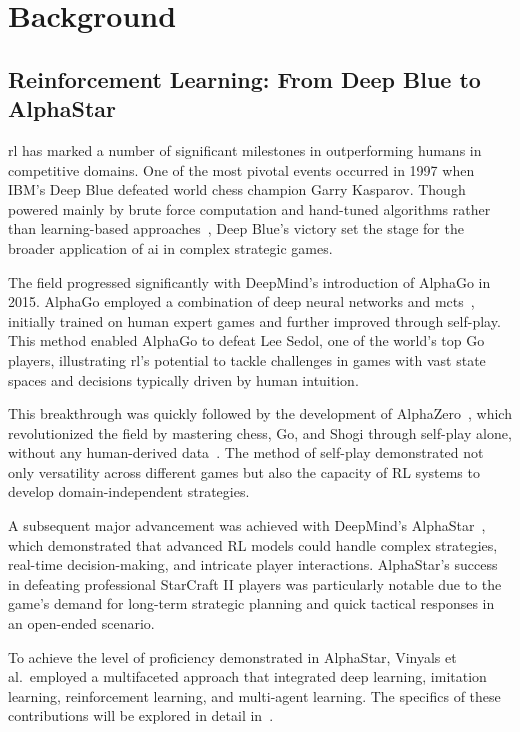 \section{Background}%
\label{sec:background}

    \subsection*{Reinforcement Learning: From Deep Blue to AlphaStar}%

\Gls{rl} has marked a number of significant milestones in outperforming humans 
in competitive domains. One of the most pivotal events occurred in 1997 
when IBM's Deep Blue defeated world chess champion Garry Kasparov. Though 
powered mainly by brute force computation and hand-tuned algorithms rather than 
learning-based approaches~\cite{campbell2002}, Deep Blue's victory set the 
stage for the broader application of \gls{ai} in complex strategic games.

The field progressed significantly with DeepMind's introduction of AlphaGo 
in 2015. AlphaGo employed a combination of deep neural networks and 
\gls{mcts}~\cite{silver2016}, initially trained on human expert games and 
further improved through self-play.
This method enabled AlphaGo to defeat Lee Sedol, one of the world's top Go 
players, illustrating \gls{rl}'s potential to tackle challenges in games with 
vast state spaces and decisions typically driven by human intuition.

This breakthrough was quickly followed by the development of 
AlphaZero~\cite{silver2017}, which revolutionized the field by mastering chess,
Go, and Shogi through self-play alone, without any human-derived 
data~\cite{silver2017a}. The method of self-play demonstrated not only 
versatility across different games but also the capacity of RL systems to 
develop domain-independent strategies.

A subsequent major advancement was achieved with DeepMind's 
AlphaStar~\cite{vinyals2019}, 
which demonstrated that advanced RL models could handle complex strategies, 
real-time decision-making, and intricate player interactions. 
AlphaStar's success in defeating professional StarCraft II players
was particularly notable due to the game's demand for long-term strategic 
planning and quick tactical responses in an open-ended scenario.

To achieve the level of proficiency demonstrated in AlphaStar, 
Vinyals et al.~employed a multifaceted approach that integrated deep learning,
imitation learning, reinforcement learning, and multi-agent learning. 
The specifics of these contributions will be explored in detail 
in~.


